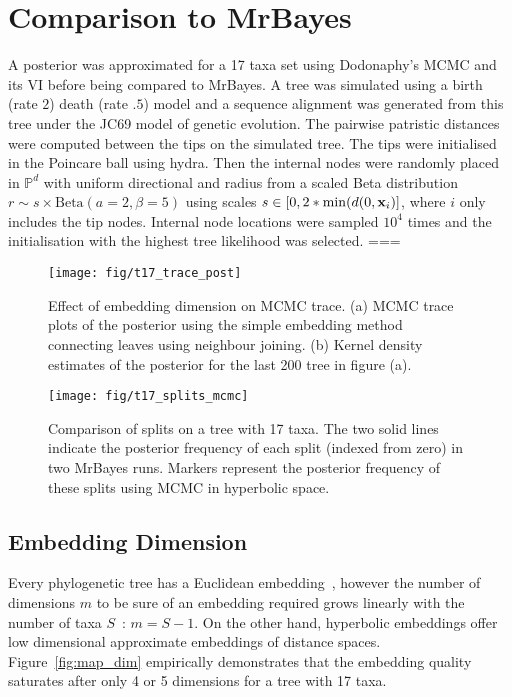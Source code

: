 \documentclass[11pt, twocolumn]{article}
\begin{document}
\section{Comparison to MrBayes}
A posterior was approximated for a 17 taxa set using Dodonaphy's MCMC and its VI before being compared to MrBayes.
A tree was simulated using a birth (rate $2$) death (rate $.5$) model and a sequence alignment was generated from this tree under the JC69 model of genetic evolution.
The pairwise patristic distances were computed between the tips on the simulated tree.
The tips were initialised in the Poincare ball using hydra.
Then the internal nodes were randomly placed in $\mathbb{P}^{d}$ with uniform directional and radius from a scaled Beta distribution $ r \sim s \times \text{Beta}(a=2, \beta=5)$ using scales $s \in [0, 2*\min(d(0, \bold{x}_{i})]$, where $i$ only includes the tip nodes.
Internal node locations were sampled $10^{4}$ times and the initialisation with the highest tree likelihood was selected.
===

\begin{figure}[htbp]
\begin{center}
    \texttt{[image: fig/t17\_trace\_post]}
\end{center}
\caption{Effect of embedding dimension on MCMC trace. (a) MCMC trace plots of the posterior using the simple embedding method connecting leaves using neighbour joining.
(b) Kernel density estimates of the posterior for the last 200 tree in figure (a).}
\end{figure}

\begin{figure}[htbp] \label{fig:splits}
    \begin{center}
        \texttt{[image: fig/t17\_splits\_mcmc]}
    \end{center}
    \caption{Comparison of splits on a tree with 17 taxa.
    The two solid lines indicate the posterior frequency of each split (indexed from zero) in two MrBayes runs.
    Markers represent the posterior frequency of these splits using MCMC in hyperbolic space.}
    \end{figure}

\subsection{Embedding Dimension}
Every phylogenetic tree has a Euclidean embedding~\cite{devienne2011euclidean}, however the number of dimensions $m$ to be sure of an embedding required grows linearly with the number of taxa $S$~\cite{deza1997geometry}: $m=S-1$.
On the other hand, hyperbolic embeddings offer low dimensional approximate embeddings of distance spaces.
Figure~\ref{fig:map_dim} empirically demonstrates that the embedding quality saturates after only 4 or 5 dimensions for a tree with 17 taxa.
\end{document}
